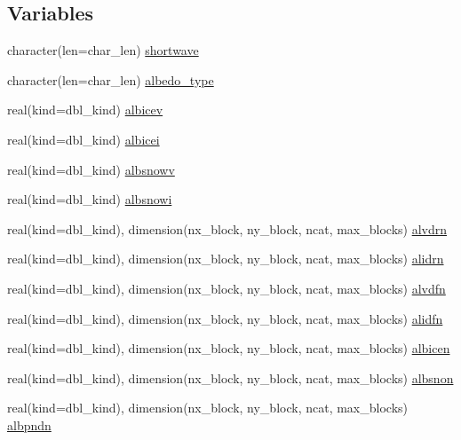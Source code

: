 \subsection*{Variables}
\begin{DoxyCompactItemize}
\item 
character(len=char\_\-len) \hyperlink{namespaceice__shortwave_ab269b293b710b271291a8d83e5994a7e}{shortwave}
\item 
character(len=char\_\-len) \hyperlink{namespaceice__shortwave_a9943b1ef08bab4d7a0a1db2b653e0a18}{albedo\_\-type}
\item 
real(kind=dbl\_\-kind) \hyperlink{namespaceice__shortwave_a308c9263f113e15d4fe2538423407b71}{albicev}
\item 
real(kind=dbl\_\-kind) \hyperlink{namespaceice__shortwave_ac87090b571de74f2625b6fdc46b6be53}{albicei}
\item 
real(kind=dbl\_\-kind) \hyperlink{namespaceice__shortwave_a86d6b36a69a220d505725c4696b45acb}{albsnowv}
\item 
real(kind=dbl\_\-kind) \hyperlink{namespaceice__shortwave_ae2f840e8aa9cc62828d602e4c8362127}{albsnowi}
\item 
real(kind=dbl\_\-kind), dimension(nx\_\-block, ny\_\-block, ncat, max\_\-blocks) \hyperlink{namespaceice__shortwave_a2230448dab2863bca3e1997a89f3412d}{alvdrn}
\item 
real(kind=dbl\_\-kind), dimension(nx\_\-block, ny\_\-block, ncat, max\_\-blocks) \hyperlink{namespaceice__shortwave_ad5fc075ea048baae3a2fec2c1cf5233d}{alidrn}
\item 
real(kind=dbl\_\-kind), dimension(nx\_\-block, ny\_\-block, ncat, max\_\-blocks) \hyperlink{namespaceice__shortwave_ac6d77b12a1e61fb0b9d1e9639f3ee6ec}{alvdfn}
\item 
real(kind=dbl\_\-kind), dimension(nx\_\-block, ny\_\-block, ncat, max\_\-blocks) \hyperlink{namespaceice__shortwave_a8b8421d0ec544285f307d5d10d456e98}{alidfn}
\item 
real(kind=dbl\_\-kind), dimension(nx\_\-block, ny\_\-block, ncat, max\_\-blocks) \hyperlink{namespaceice__shortwave_afb40f55204cb60ed558f2d5676051a8e}{albicen}
\item 
real(kind=dbl\_\-kind), dimension(nx\_\-block, ny\_\-block, ncat, max\_\-blocks) \hyperlink{namespaceice__shortwave_a1f4c83d80c19fddde454cd208383656e}{albsnon}
\item 
real(kind=dbl\_\-kind), dimension(nx\_\-block, ny\_\-block, ncat, max\_\-blocks) \hyperlink{namespaceice__shortwave_ab92a8ce0d21135900c5bfefa5016d5a7}{albpndn}

\end{DoxyCompactItemize}
